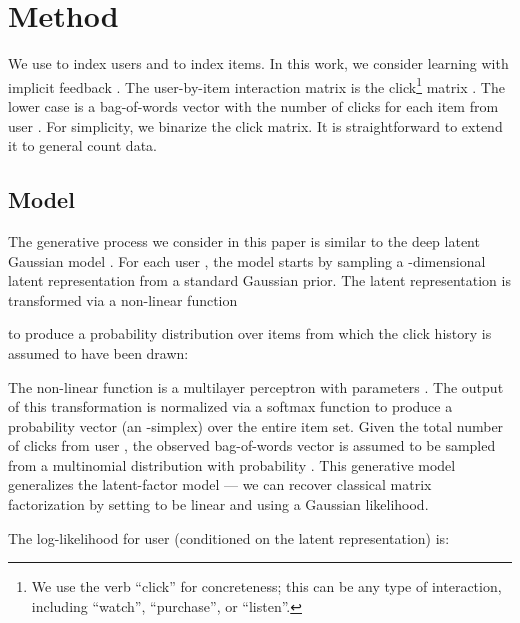 \documentclass[sigconf]{acmart}
\begin{document}
\section{Method}\label{sec:method}

We use  to index users and  to index
items. In this work, we consider learning with implicit feedback \citep{hu2008collaborative,pan2008one}. 
The user-by-item interaction matrix is the
click\footnote{We use the verb ``click'' for concreteness; this can be any type of interaction, 
including ``watch'', ``purchase'', or ``listen''.} matrix . 
The lower case  is a bag-of-words vector with the number 
of clicks for each item from user . For simplicity, we binarize the click matrix. 
It is straightforward to extend it to general count data. 

\subsection{Model}\label{sec:model}

The generative process we consider in this paper is similar to 
the deep latent Gaussian model \citep{rezende2014stochastic}. For each user , the model starts by 
sampling a -dimensional latent representation  from a standard Gaussian prior. 
The latent representation  is transformed via a 
non-linear function 
 
to produce a probability distribution over  items  from which 
the click history  is assumed to have been drawn:

The non-linear function  is a multilayer perceptron with parameters .  
The output of this transformation is normalized via a softmax function to 
produce a probability vector  (an -simplex) 
over the entire item set. 
Given the total number of clicks  from user , the observed bag-of-words vector  is assumed to be 
sampled from a multinomial distribution with probability . 
This generative model generalizes the 
latent-factor model --- we can recover classical matrix factorization \citep{salakhutdinov2008probabilistic} by
setting  to be linear and using a Gaussian likelihood. 

The log-likelihood for user  (conditioned on the latent representation) is: 
\end{document}
